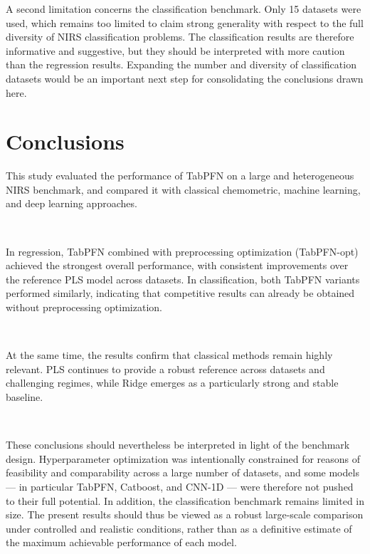 \documentclass{article}
\begin{document}
A second limitation concerns the classification benchmark. Only 15 datasets were used, which remains too limited to claim strong generality with respect to the full diversity of NIRS classification problems. The classification results are therefore informative and suggestive, but they should be interpreted with more caution than the regression results. Expanding the number and diversity of classification datasets would be an important next step for consolidating the conclusions drawn here.



\section{Conclusions}

This study evaluated the performance of TabPFN on a large and heterogeneous NIRS benchmark, and compared it with classical chemometric, machine learning, and deep learning approaches.

~

In regression, TabPFN combined with preprocessing optimization (TabPFN-opt) achieved the strongest overall performance, with consistent improvements over the reference PLS model across datasets. In classification, both TabPFN variants performed similarly, indicating that competitive results can already be obtained without preprocessing optimization.

~

At the same time, the results confirm that classical methods remain highly relevant. PLS continues to provide a robust reference across datasets and challenging regimes, while Ridge emerges as a particularly strong and stable baseline.

~

These conclusions should nevertheless be interpreted in light of the benchmark design. Hyperparameter optimization was intentionally constrained for reasons of feasibility and comparability across a large number of datasets, and some models --- in particular TabPFN, Catboost, and CNN-1D --- were therefore not pushed to their full potential. In addition, the classification benchmark remains limited in size. The present results should thus be viewed as a robust large-scale comparison under controlled and realistic conditions, rather than as a definitive estimate of the maximum achievable performance of each model.

~
\end{document}
